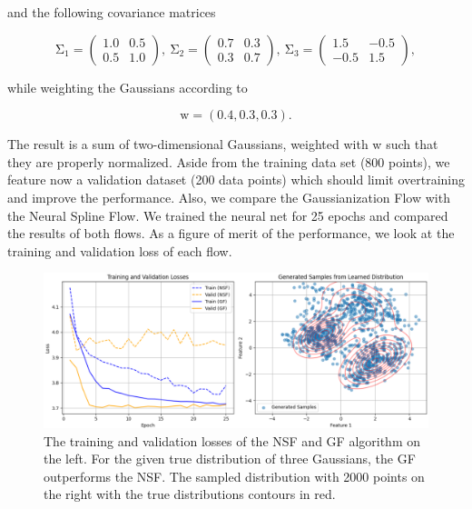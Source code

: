\documentclass[
nofootinbib,
 amsmath,amssymb,
 aps,
]{revtex4-2}
\begin{document}
and the following covariance matrices

\begin{equation}
    \mathrm{\Sigma_1} = \begin{pmatrix} 1.0 & 0.5 \\ 0.5 & 1.0 \end{pmatrix},\ \mathrm{\Sigma_2} = \begin{pmatrix} 0.7 & 0.3 \\ 0.3 & 0.7 \end{pmatrix},\ \mathrm{\Sigma_3} = \begin{pmatrix} 1.5 & -0.5 \\ -0.5 & 1.5 \end{pmatrix},
\label{eqn:multimod_cov}
\end{equation}

while weighting the Gaussians according to

\begin{equation}
    \mathrm{w} = (0.4, 0.3, 0.3).
\label{eqn:multimod_weight}
\end{equation}

The result is a sum of two-dimensional Gaussians, weighted with w such that they are properly normalized. Aside from the training data set (800 points), we feature now a validation dataset (200 data points) which should limit overtraining and improve the performance. Also, we compare the Gaussianization Flow with the Neural Spline Flow. We trained the neural net for 25 epochs and compared the results of both flows. As a figure of merit of the performance, we look at the training and validation loss of each flow. \\

\begin{figure}[h!]
\includegraphics[scale=0.60]{Plots/nf_2d_gaus_multimodal.png}
\caption{\label{fig:nf_2d_gaus_multimodal} The training and validation losses of the NSF and GF algorithm on the left. For the given true distribution of three Gaussians, the GF outperforms the NSF. The sampled distribution with 2000 points on the right with the true distributions contours in red.}
\end{figure}
\end{document}
